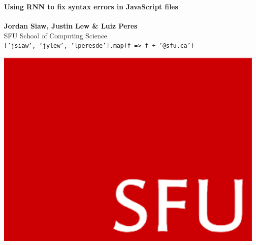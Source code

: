 \documentclass[a0,portrait]{a0poster}
\begin{document}


\begin{minipage}[b]{0.75\linewidth}
\veryHuge \color{NavyBlue} \textbf{Using RNN to fix syntax errors in JavaScript files} \color{Black}\\ %
\Huge\textit{}\\[2cm] %
\huge \textbf{Jordan Siaw, Justin Lew \& Luiz Peres}\\[0.5cm] %
\huge SFU School of Computing Science\\[0.4cm] %
\Large \texttt{[\color{NavyBlue}'jsiaw'\color{Black}, \color{NavyBlue}'jylew'\color{Black}, \color{NavyBlue}'lperesde']\color{Black}.\color[rgb]{0.435, 0.258, 0.756}map\color{Black}(f \color[rgb]{0.843, 0.227, 0.286}=> \color{Black}f \color[rgb]{0.843, 0.227, 0.286}+ \color{NavyBlue}'@sfu.ca'\color{Black})}\\
\end{minipage}
%
\begin{minipage}[b]{0.25\linewidth}
\includegraphics[width=20cm]{logo.png}\\
\end{minipage}
\end{document}
